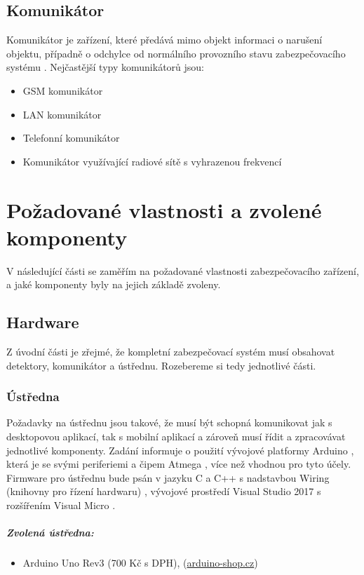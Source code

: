 \documentclass[FM,MP]{tulthesis}  %
\begin{document}
\section{Komunikátor}
Komunikátor je zařízení, které předává mimo objekt informaci o narušení objektu, případně o odchylce od normálního provozního stavu zabezpečovacího systému \cite{Electronic security signalisation}. Nejčastější typy komunikátorů jsou:

\begin{itemize}
\item GSM komunikátor
\item LAN komunikátor
\item Telefonní komunikátor
\item Komunikátor využívající radiové sítě s vyhrazenou frekvencí
\end{itemize} 


\chapter{Požadované vlastnosti a zvolené komponenty}
V následující části se zaměřím na požadované vlastnosti zabezpečovacího zařízení, a jaké komponenty byly na jejich základě zvoleny.

\section{Hardware}
Z úvodní části je zřejmé, že kompletní zabezpečovací systém musí obsahovat detektory, komunikátor a ústřednu. Rozebereme si tedy jednotlivé části.

\subsection{Ústředna}
Požadavky na ústřednu jsou takové, že musí být schopná komunikovat jak s desktopovou aplikací, tak s mobilní aplikací a zároveň musí řídit a zpracovávat jednotlivé komponenty. Zadání informuje o použití vývojové platformy Arduino \cite{Pruvodce arduinem}, která je se svými periferiemi \cite{Arduino schematic} a čipem Atmega \cite{Atmega datasheet}, více než vhodnou pro tyto účely. Firmware pro ústřednu bude psán v jazyku  C a C++ s nadstavbou Wiring (knihovny pro řízení hardwaru) \cite{Wiring}, vývojové prostředí Visual Studio 2017 s rozšířením Visual Micro \cite{Visual Micro}.

\paragraph{Zvolená ústředna:}
\begin{itemize}
\item Arduino Uno Rev3 (700 Kč s DPH), (\url{arduino-shop.cz})
\end{itemize}
\end{document}
